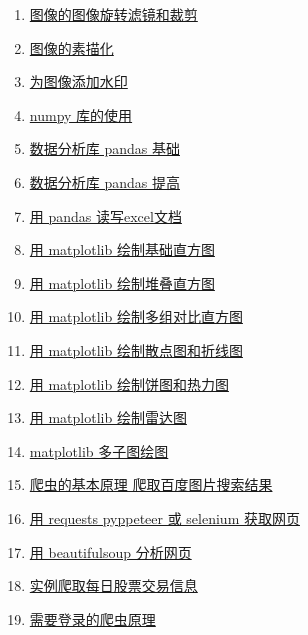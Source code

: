 \documentclass[11pt]{article}
\begin{document}
\begin{multicols}{2}
\begin{enumerate}
		\item  \href{https://mp.weixin.qq.com/s/UiR0IgBftlkW8dGx2yM1-Q}{图像的图像旋转滤镜和裁剪} %
		\item  \href{https://mp.weixin.qq.com/s/0yDIjbSZlzPVNw7N_BahFQ}{图像的素描化} %
		\item  \href{https://mp.weixin.qq.com/s/LFGsI-SLJmEFK-FCFS1Jdg}{为图像添加水印} %
		\item  \href{https://mp.weixin.qq.com/s/bh4mIklqcHJ15Cm7Bpjt3w}{numpy 库的使用} %
		\item  \href{https://mp.weixin.qq.com/s/snk6OYQ1_SoYfbOUny3jGA}{数据分析库 pandas 基础} %
		\item  \href{https://mp.weixin.qq.com/s/mzs3ZFJKTHLVG1PqeX5NsQ}{数据分析库 pandas 提高} %
		\item  \href{https://mp.weixin.qq.com/s/1Q45HYBxNxTErki6qmHFsg}{用 pandas 读写excel文档} %
		\item  \href{https://mp.weixin.qq.com/s/XZtp5jsmQVM6FFdzQVh7hQ}{用 matplotlib 绘制基础直方图} %
		\item  \href{https://mp.weixin.qq.com/s/NEMLTmQrBS6tLTw_i_r5Ow}{用 matplotlib 绘制堆叠直方图} %
		\item  \href{https://mp.weixin.qq.com/s/7nl8GgEYBAQTrtCCTkqrdA}{用 matplotlib 绘制多组对比直方图} %
		\item  \href{https://mp.weixin.qq.com/s/rwmHicoviZDpEdlVxL-YDQ}{用 matplotlib 绘制散点图和折线图} %
		\item  \href{https://mp.weixin.qq.com/s/RVw2MDsDgcA7JsmDsCdGig}{用 matplotlib 绘制饼图和热力图} %
		\item  \href{https://mp.weixin.qq.com/s/2l5AV-FHKaai3xz86Uzc-Q}{用 matplotlib 绘制雷达图} %
		\item  \href{https://mp.weixin.qq.com/s/iki2DJSOhO5YfXe2P71NSg}{matplotlib 多子图绘图} %
		\item  \href{https://mp.weixin.qq.com/s/g9-aHqC_ds3L1T4BvMshbg}{爬虫的基本原理 爬取百度图片搜索结果} %
		\item  \href{https://mp.weixin.qq.com/s/XqRwtGAQfzchAkjyIgUaYA}{用 requests  pyppeteer 或 selenium 获取网页} %
		\item  \href{https://mp.weixin.qq.com/s/fk4nqoj-MH3HxQtsa0olpA}{用 beautifulsoup 分析网页} %
		\item  \href{https://mp.weixin.qq.com/s/8UNKg60wrWxHGHpHxZrFvg}{实例爬取每日股票交易信息} %
		\item  \href{https://mp.weixin.qq.com/s/d_U0DBfafPUhp14iynNUTA}{需要登录的爬虫原理} %

\end{enumerate}
\end{multicols}
\end{document}

